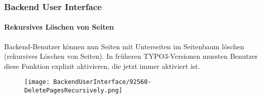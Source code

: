 %

\begin{frame}[fragile]
	\frametitle{Backend User Interface}
	\framesubtitle{Rekursives Löschen von Seiten}

	Backend-Benutzer können nun Seiten mit Unterseiten im Seitenbaum löschen (rekursives Löschen von Seiten).
	In früheren TYPO3-Versionen mussten Benutzer diese Funktion explizit aktivieren, die jetzt immer aktiviert ist.

	\begin{figure}
		\texttt{[image: BackendUserInterface/92560-DeletePagesRecursively.png]}
	\end{figure}

\end{frame}

